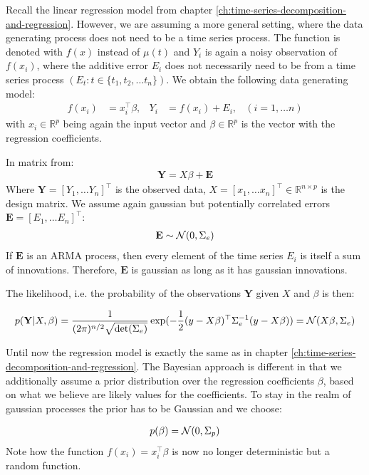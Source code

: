 Recall the linear regression model from chapter \ref{ch:time-series-decomposition-and-regression}.
However, we are assuming a more general setting, where the data generating process does not need to be a time series process.
The function is denoted with $f(x)$ instead of $\mu(t)$ and $Y_i$ is again a noisy observation of
$f(x_i)$, where the additive error $E_i$ does not necessarily need to be from a time series process $(E_t: t \in \{t_1, t_2, \dots  t_n \})$.
We obtain the following data generating model:
\begin{align*}
    f(x_i) &= x_i^{\top}\beta, & Y_i &= f(x_i) + E_i,  & (i = 1, \dots n)
\end{align*}
with $x_i \in \mathbb{R}^p$ being again the input vector and $\beta \in \mathbb{R}^p$ is the vector with
the regression coefficients.

In matrix from:
\begin{align*}
    \mathbf{Y} = X \beta + \mathbf{E}
\end{align*}
Where $\mathbf{Y} = [Y_{1}, \dots Y_{n}]^{\top}$ is the observed data,
$X = [x_{1}, \dots x_{n}]^{\top} \in \mathbb{R}^{n \times p}$ is the design matrix.
We assume again gaussian but potentially correlated errors $\mathbf{E} = [E_{1}, \dots E_{n}]^{\top}$:
\begin{gather*}
    \mathbf{E} \sim \operatorname{\mathcal{N}}(0, \Sigma_e)
\end{gather*}
If $\mathbf{E}$ is an ARMA process, then every element of the time series $E_{i}$
is itself a sum of innovations.
Therefore, $\mathbf{E}$ is gaussian as long as it has gaussian innovations.

The likelihood, i.e. the probability of the observations $\mathbf{Y}$ given $X$ and $\beta$ is then:

\begin{gather*}
    p(\mathbf{Y}|X,\beta)
    = \frac{1}{(2\pi)^{n/2} \sqrt {\det(\Sigma_e)}}
    \exp(-\frac{1}{2}(y - X\beta)^{\top} \Sigma_e^{-1}(y-X\beta))
    = \operatorname{\mathcal{N}}(X \beta, \Sigma_e)
\end{gather*}

Until now the regression model is exactly the same as in chapter \ref{ch:time-series-decomposition-and-regression}.
The Bayesian approach is different in that we additionally assume a prior distribution over the
regression coefficients $\beta$, based on what we believe are likely values for the coefficients.
To stay in the realm of gaussian processes the prior has to be Gaussian and we choose:

\begin{gather*}
    p(\beta) = \operatorname{\mathcal{N}}(0, \Sigma_p)
\end{gather*}
Note how the function $f(x_i)=x_i^{\top}\beta$ is now no longer deterministic but a random function.

